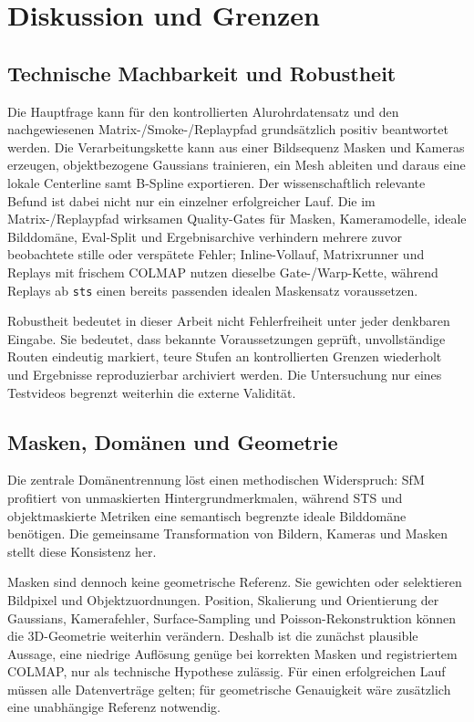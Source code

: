 \section{Diskussion und Grenzen}

\subsection{Technische Machbarkeit und Robustheit}

Die Hauptfrage kann für den kontrollierten Alurohrdatensatz und den
nachgewiesenen Matrix-/Smoke-/Replaypfad grundsätzlich positiv beantwortet
werden. Die Verarbeitungskette kann aus einer Bildsequenz Masken und Kameras
erzeugen, objektbezogene Gaussians trainieren, ein Mesh ableiten und daraus
eine lokale Centerline samt B-Spline exportieren. Der wissenschaftlich
relevante Befund ist dabei nicht nur ein einzelner erfolgreicher Lauf. Die im
Matrix-/Replaypfad wirksamen Quality-Gates für Masken, Kameramodelle, ideale
Bilddomäne, Eval-Split und Ergebnisarchive verhindern mehrere zuvor
beobachtete stille oder verspätete Fehler; Inline-Vollauf, Matrixrunner und
Replays mit frischem COLMAP nutzen dieselbe Gate-/Warp-Kette, während
Replays ab \texttt{sts} einen bereits passenden idealen Maskensatz voraussetzen.

Robustheit bedeutet in dieser Arbeit nicht Fehlerfreiheit unter jeder
denkbaren Eingabe. Sie bedeutet, dass bekannte Voraussetzungen geprüft,
unvollständige Routen eindeutig markiert, teure Stufen an kontrollierten
Grenzen wiederholt und Ergebnisse reproduzierbar archiviert werden. Die
Untersuchung nur eines Testvideos begrenzt weiterhin die externe Validität.

\subsection{Masken, Domänen und Geometrie}

Die zentrale Domänentrennung löst einen methodischen Widerspruch: SfM profitiert
von unmaskierten Hintergrundmerkmalen, während STS und objektmaskierte
Metriken eine semantisch begrenzte ideale Bilddomäne benötigen. Die gemeinsame
Transformation von Bildern, Kameras und Masken stellt diese Konsistenz her.

Masken sind dennoch keine geometrische Referenz. Sie gewichten oder selektieren
Bildpixel und Objektzuordnungen. Position, Skalierung und Orientierung der
Gaussians, Kamerafehler, Surface-Sampling und Poisson-Rekonstruktion können die
3D-Geometrie weiterhin verändern. Deshalb ist die zunächst plausible Aussage,
eine niedrige Auflösung genüge bei korrekten Masken und registriertem COLMAP,
nur als technische Hypothese zulässig. Für einen erfolgreichen Lauf müssen alle
Datenverträge gelten; für geometrische Genauigkeit wäre zusätzlich eine
unabhängige Referenz notwendig.

